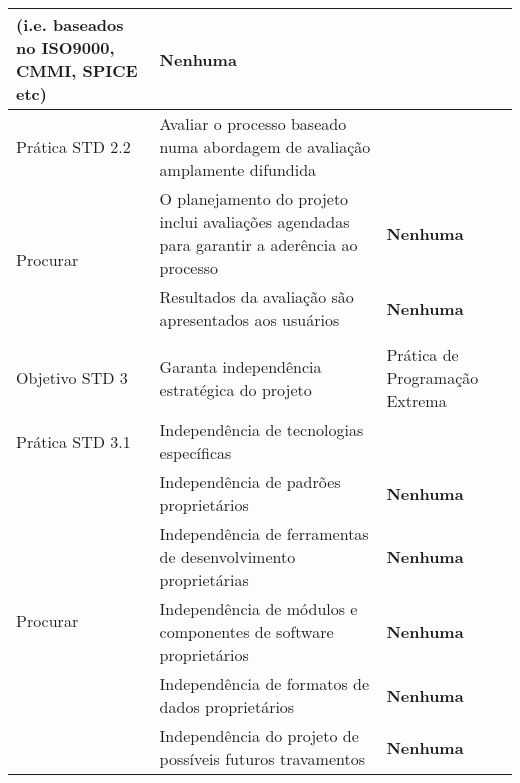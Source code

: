 \begin{longtable}{|p{2cm}|p{7cm}|p{7cm}|}
  (i.e. baseados no ISO9000, CMMI, SPICE etc)&
  \textbf{Nenhuma} \\
  \hline \cellcolor[gray]{0.9} Prática STD 2.2 & \cellcolor[gray]{0.9}
  Avaliar o processo baseado numa abordagem de
  avaliação amplamente difundida & \\
  \hline \multirow{2}{*}{Procurar} & O planejamento do projeto inclui
  avaliações agendadas para garantir a aderência ao processo &
  \textbf{Nenhuma} \\
  \cline{2-3} & Resultados da avaliação são apresentados aos usuários
  &
  \textbf{Nenhuma} \\
  \hline
  & & \\
  \hline \cellcolor[gray]{0.6} Objetivo STD 3 & \cellcolor[gray]{0.6}
  Garanta independência estratégica do projeto & Prática de Programação Extrema \\
  \hline \cellcolor[gray]{0.9} Prática STD 3.1 & \cellcolor[gray]{0.9}
  Independência de tecnologias específicas & \\
  \hline \multirow{5}{*}{Procurar} & Independência de padrões
  proprietários &
  \textbf{Nenhuma} \\
  \cline{2-3} & Independência de ferramentas de desenvolvimento
  proprietárias &
  \textbf{Nenhuma} \\
  \cline{2-3} & Independência de módulos e componentes de software
  proprietários &
  \textbf{Nenhuma} \\
  \cline{2-3} & Independência de formatos de dados proprietários &
  \textbf{Nenhuma} \\
  \cline{2-3} & Independência do projeto de possíveis futuros
  travamentos &
  \textbf{Nenhuma} \\
  \hline
\end{longtable}

